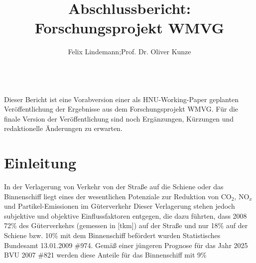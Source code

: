  


\title{Abschlussbericht: Forschungsprojekt WMVG}
\author{Felix Lindemann;Prof. Dr. Oliver Kunze}



\maketitle{}  
\label{_Toc356390934}
\label{_Toc356505682}
\label{_Toc363572015}
\label{_Toc363601730}
\label{_Ref363998949}
\label{_Ref364762752}~\\[4em]
Dieser Bericht ist eine Vorabversion einer als HNU-Working-Paper geplanten Veröffentlichung der Ergebnisse aus dem Forschungsprojekt WMVG. Für die finale Version der Veröffentlichung sind noch Ergänzungen, Kürzungen und redaktionelle Änderungen zu erwarten.~\\

\newpage 
% 
\section{Einleitung }
\label{_Toc365801586}
\label{_Toc366766070}
\label{_Toc366775264}
\label{_Toc363572016}
\label{_Toc363601731}

\label{_Ref361848342}
\label{_Toc363572018}
\label{_Toc363601733}In der Verlagerung von Verkehr von der Straße auf die Schiene oder das Binnenschiff liegt eines der wesentlichen Potenziale zur Reduktion von CO$_2$, NO$_x$ und Partikel-Emissionen im Güterverkehr  \autocites[][]{bib.217} Dieser Verlagerung stehen jedoch subjektive und objektive Einflussfaktoren entgegen, die dazu führten, dass 2008 72\% des Güterverkehrs (gemessen in [tkm]) auf der Straße und nur 18\% auf der Schiene bzw. 10\% mit dem Binnenschiff befördert wurden 
\label{_CTVFORMATTIME_635146861582039693}{Statistisches Bundesamt 13.01.2009 \#974}. Gemäß einer jüngeren Prognose für das Jahr 2025 {BVU 2007 \#821} werden diese Anteile für das Binnenschiff mit 9\%
\\

